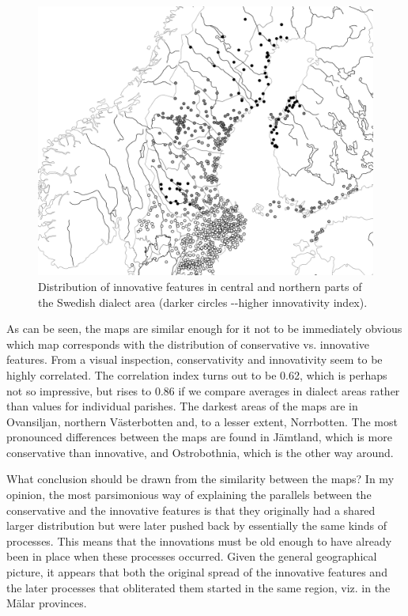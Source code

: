 \begin{figure}[h]
\includegraphics[height=.5\textheight]{figures/39_DistributionInnovativeFeatures}
\caption{Distribution of innovative features in central and northern parts of the Swedish dialect area (darker circles -{}-higher innovativity index). }
\label{map:35}
\end{figure}
 
 
As can be seen, the maps are similar enough for it not to be immediately obvious which map corresponds with the distribution of conservative vs. innovative features. From a visual inspection, conservativity and innovativity seem to be highly correlated. The correlation index turns out to be 0.62, which is perhaps not so impressive, but rises to 0.86 if we compare averages in dialect areas rather than values for individual parishes. The darkest areas of the maps are in Ovansiljan, northern Västerbotten and, to a lesser extent, Norrbotten. The most pronounced differences between the maps are found in Jämtland, which is more conservative than innovative, and Ostrobothnia, which is the other way around. 

What conclusion should be drawn from the similarity between the maps? In my opinion, the most parsimonious way of explaining the parallels between the conservative and the innovative features is that they originally had a shared larger distribution but were later pushed back by essentially the same kinds of processes. This means that the innovations must be old enough to have already been in place when these processes occurred. Given the general geographical picture, it appears that both the original spread of the innovative features and the later processes that obliterated them started in the same region, viz. in the Mälar provinces. 

